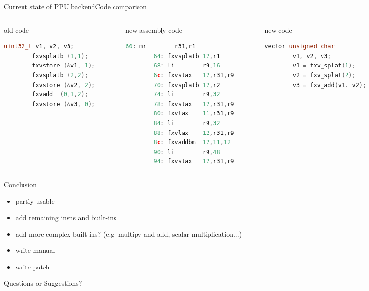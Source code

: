 \documentclass[10pt]{beamer}
\begin{document}
\begin{frame}[fragile]{Current state of PPU backend}{Code comparison}
\begin{columns}[t]
	\begin{column}{0.3\textwidth}
      \begin{block}{old code}
       \begin{lstlisting}[language=C++,basicstyle=\ttfamily\scriptsize,keywordstyle=\color{red}]
		uint32_t v1, v2, v3;
		fxvsplatb (1,1);
		fxvstore (&v1, 1);
		fxvsplatb (2,2);
		fxvstore (&v2, 2);
		fxvadd 	(0,1,2);
		fxvstore (&v3, 0);
		\end{lstlisting}
      \end{block}
    \end{column}    
    \begin{column}{0.3\textwidth}
      \begin{block}{new assembly code}
        \begin{lstlisting}[language=C++,basicstyle=\ttfamily\scriptsize,keywordstyle=\color{red}]
		60: mr        r31,r1
		64: fxvsplatb 12,r1 
		68: li        r9,16
		6c: fxvstax   12,r31,r9
		70: fxvsplatb 12,r2
		74: li        r9,32
		78: fxvstax   12,r31,r9
		80: fxvlax    11,r31,r9
		84: li        r9,32
		88: fxvlax    12,r31,r9
		8c: fxvaddbm  12,11,12
		90: li        r9,48
		94: fxvstax   12,r31,r9
	\end{lstlisting}
      \end{block}
    \end{column}
    \begin{column}{0.3\textwidth}
      \begin{block}{new code}
        \begin{lstlisting}[language=C++,basicstyle=\ttfamily\scriptsize,keywordstyle=\color{red}]
		vector unsigned char
		v1, v2, v3;
		v1 = fxv_splat(1);
		v2 = fxv_splat(2);	
		v3 = fxv_add(v1. v2);			
	\end{lstlisting}
      \end{block}
    \end{column}
\end{columns}
\end{frame}

\begin{frame}{Conclusion}
	\begin{itemize}
		\item partly usable
		\item add remaining insns and built-ins
		\item add more complex built-ins? (e.g. multipy and add, scalar multiplication...)
		\item write manual
		\item write patch
	\end{itemize}
\end{frame}

\begin{frame}[plain,c]
\begin{center}
\Huge Questions or Suggestions?
\end{center}
\end{frame}
\end{document}
